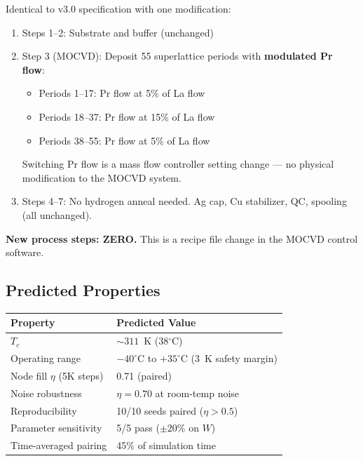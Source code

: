 \documentclass[11pt, a4paper]{article}
\begin{document}
Identical to v3.0 specification with one modification:

\begin{enumerate}[nosep]
  \item Steps 1--2: Substrate and buffer (unchanged)
  \item Step 3 (MOCVD): Deposit 55 superlattice periods with
        \textbf{modulated Pr flow}:
        \begin{itemize}[nosep]
          \item Periods 1--17: Pr flow at 5\% of La flow
          \item Periods 18--37: Pr flow at 15\% of La flow
          \item Periods 38--55: Pr flow at 5\% of La flow
        \end{itemize}
        Switching Pr flow is a mass flow controller setting change
        --- no physical modification to the MOCVD system.
  \item Steps 4--7: No hydrogen anneal needed. Ag cap, Cu
        stabilizer, QC, spooling (all unchanged).
\end{enumerate}

\textcolor{nm-green}{\textbf{New process steps: ZERO.}} This is a
recipe file change in the MOCVD control software.

\subsection{Predicted Properties}

\begin{center}
\begin{tabular}{@{}ll@{}}
\toprule
\textbf{Property} & \textbf{Predicted Value} \\
\midrule
$T_c$ & $\sim 311$~K (38$^\circ$C) \\
Operating range & $-40^\circ$C to $+35^\circ$C (3~K safety margin) \\
Node fill $\eta$ (5K steps) & 0.71 (paired) \\
Noise robustness & $\eta = 0.70$ at room-temp noise \\
Reproducibility & 10/10 seeds paired ($\eta > 0.5$) \\
Parameter sensitivity & 5/5 pass ($\pm 20\%$ on $W$) \\
Time-averaged pairing & 45\% of simulation time \\
\bottomrule
\end{tabular}
\end{center}
\end{document}

